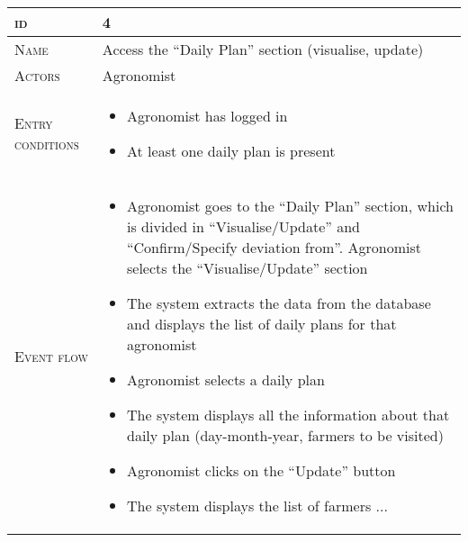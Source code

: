 \begin{table}[H]
    \centering
    \begin{tabular}[c]{|l|p{}|}
        \hline %
    	\textsc{id}                 &   4\\
    	\hline %
    	\textsc{Name}               &   Access the “Daily Plan” section (visualise, update)\\
    	\hline %
    	\textsc{Actors}             &   Agronomist\\
    	\hline %
    	\textsc{Entry conditions}   &   \begin{itemize}
                                    	    \item Agronomist has logged in
                                    	    \item At least one daily plan is present
                                        \end{itemize}\\
    	\hline %
    	\textsc{Event flow}         &   \footnotesize
            	                        \begin{itemize}
                                    	    \item Agronomist goes to the “Daily Plan” section, which is divided in “Visualise/Update” and “Confirm/Specify deviation from”. Agronomist selects the “Visualise/Update” section
                                    		\item The system extracts the data from the database and displays the list of daily plans for that agronomist
                                    		\item Agronomist selects a daily plan
                                    		\item The system displays all the information about that daily plan (day-month-year, farmers to be visited)
                                    		\item Agronomist clicks on the “Update” button
                                    		\item The system displays the list of farmers ...
                                        \end{itemize}\\

\end{tabular}
\end{table}
